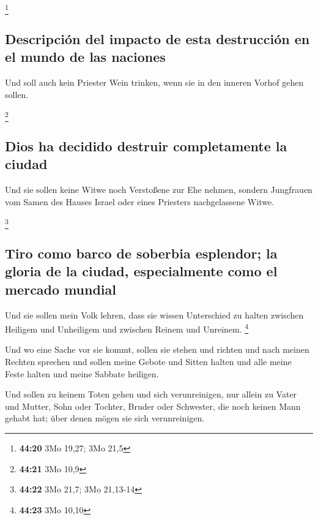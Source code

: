\footnote{\textbf{44:20} 3Mo 19,27; 3Mo 21,5}

\hypertarget{descripciuxf3n-del-impacto-de-esta-destrucciuxf3n-en-el-mundo-de-las-naciones}{%
\subsection{Descripción del impacto de esta destrucción en el mundo de
las
naciones}\label{descripciuxf3n-del-impacto-de-esta-destrucciuxf3n-en-el-mundo-de-las-naciones}}

 Und soll auch kein Priester Wein trinken, wenn sie in
den inneren Vorhof gehen sollen.

\footnote{\textbf{44:21} 3Mo 10,9}

\hypertarget{dios-ha-decidido-destruir-completamente-la-ciudad}{%
\subsection{Dios ha decidido destruir completamente la
ciudad}\label{dios-ha-decidido-destruir-completamente-la-ciudad}}

 Und sie sollen keine Witwe noch Verstoßene zur Ehe
nehmen, sondern Jungfrauen vom Samen des Hauses Israel oder eines
Priesters nachgelassene Witwe.

\footnote{\textbf{44:22} 3Mo 21,7; 3Mo 21,13-14}

\hypertarget{tiro-como-barco-de-soberbia-esplendor-la-gloria-de-la-ciudad-especialmente-como-el-mercado-mundial}{%
\subsection{Tiro como barco de soberbia esplendor; la gloria de la
ciudad, especialmente como el mercado
mundial}\label{tiro-como-barco-de-soberbia-esplendor-la-gloria-de-la-ciudad-especialmente-como-el-mercado-mundial}}

 Und sie sollen mein Volk lehren, dass sie wissen
Unterschied zu halten zwischen Heiligem und Unheiligem und zwischen
Reinem und Unreinem. \footnote{\textbf{44:23} 3Mo 10,10}

 Und wo eine Sache vor sie kommt, sollen sie stehen und
richten und nach meinen Rechten sprechen und sollen meine Gebote und
Sitten halten und alle meine Feste halten und meine Sabbate heiligen.

 Und sollen zu keinem Toten gehen und sich verunreinigen,
nur allein zu Vater und Mutter, Sohn oder Tochter, Bruder oder
Schwester, die noch keinen Mann gehabt hat; über denen mögen sie sich
verunreinigen.


